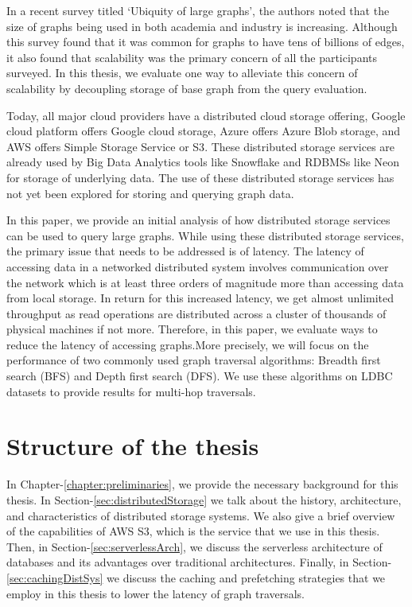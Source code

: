 In a recent survey titled `Ubiquity of large graphs'\cite{sahu2017ubiquity}, the
authors noted that the size of graphs being used in both academia and industry
is increasing. Although this survey found that it was common for graphs to have
tens of billions of edges, it also found that scalability was the primary
concern of all the participants surveyed\cite{sahu2017ubiquity}. In this thesis,
we evaluate one way to alleviate this concern of scalability by decoupling
storage of base graph from the query evaluation.

\medskip
Today, all major cloud providers have a distributed cloud storage offering,
Google cloud platform offers Google cloud storage\cite{gcpStorage}, Azure offers
Azure Blob storage\cite{azureStorage}, and AWS offers Simple Storage Service or 
S3\cite{awsS3}. These distributed storage services are already used by Big Data
Analytics tools like Snowflake\cite{snowflake} and RDBMSs like Neon\cite{neonPostgres} 
for storage of underlying data. The use of these distributed storage services has not
yet been explored for storing and querying graph data.

\medskip
In this paper, we provide an initial analysis of how distributed storage services can 
be used to query large graphs. While using these distributed storage services, the primary
issue that needs to be addressed is of latency. The latency of accessing data in a networked
distributed system involves communication over the network which is at least three orders of
magnitude more than accessing data from local storage. In return for this increased latency,
we get almost unlimited throughput as read operations are distributed across a cluster 
of thousands of physical machines if not more. Therefore, in this paper, we evaluate ways to
reduce the latency of accessing graphs.More precisely, we will focus on the 
performance of two commonly used graph traversal algorithms: Breadth first search 
(BFS) and Depth first search (DFS). We use these algorithms on LDBC datasets
to provide results for multi-hop traversals. 

\section{Structure of the thesis}

\medskip
In Chapter-\ref{chapter:preliminaries}, we provide the necessary background for
this thesis. In Section-\ref{sec:distributedStorage} we talk about the
history, architecture, and characteristics of distributed storage systems. We
also give a brief overview of the capabilities of AWS S3, which is the service
that we use in this thesis. Then,
in Section-\ref{sec:serverlessArch}, we discuss the serverless architecture of
databases and its advantages over traditional architectures. Finally, in
Section-\ref{sec:cachingDistSys} we discuss the caching and prefetching
strategies that we employ in this thesis to lower the latency of graph
traversals.

